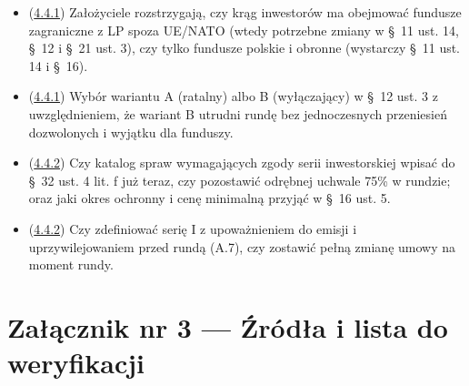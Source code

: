 \documentclass[12pt,a4paper]{report}
\begin{document}
\begin{itemize}
  \item (\hyperref[memo:4.4.1]{4.4.1}) Założyciele rozstrzygają, czy krąg inwestorów ma obejmować fundusze zagraniczne z LP spoza UE/NATO (wtedy potrzebne zmiany w §~11 ust. 14, §~12 i §~21 ust. 3), czy tylko fundusze polskie i obronne (wystarczy §~11 ust. 14 i §~16).
  \item (\hyperref[memo:4.4.1]{4.4.1}) Wybór wariantu A (ratalny) albo B (wyłączający) w §~12 ust. 3 z uwzględnieniem, że wariant B utrudni rundę bez jednoczesnych przeniesień dozwolonych i wyjątku dla funduszy.
  \item (\hyperref[memo:4.4.2]{4.4.2}) Czy katalog spraw wymagających zgody serii inwestorskiej wpisać do §~32 ust. 4 lit. f już teraz, czy pozostawić odrębnej uchwale 75\% w rundzie; oraz jaki okres ochronny i cenę minimalną przyjąć w §~16 ust. 5.
  \item (\hyperref[memo:4.4.2]{4.4.2}) Czy zdefiniować serię I z upoważnieniem do emisji i uprzywilejowaniem przed rundą (A.7), czy zostawić pełną zmianę umowy na moment rundy.
\end{itemize}

\section*{Załącznik nr 3 --- Źródła i lista do weryfikacji}
\end{document}
